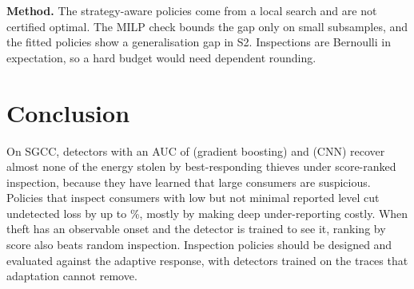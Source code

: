 \documentclass[journal]{IEEEtran}
\begin{document}
\textbf{Method.} The strategy-aware policies come from a local search and are not certified optimal. The MILP check bounds the gap only on small subsamples, and the fitted policies show a generalisation gap in S2. Inspections are Bernoulli in expectation, so a hard budget would need dependent rounding.

\section{Conclusion}
On SGCC, detectors with an AUC of \rAucLevel{} (gradient boosting) and \rCnnAuc{} (CNN) recover almost none of the energy stolen by best-responding thieves under score-ranked inspection, because they have learned that large consumers are suspicious. Policies that inspect consumers with low but not minimal reported level cut undetected loss by up to \rSeGainRelMaxSOne\%, mostly by making deep under-reporting costly. When theft has an observable onset and the detector is trained to see it, ranking by score also beats random inspection. Inspection policies should be designed and evaluated against the adaptive response, with detectors trained on the traces that adaptation cannot remove.



\end{document}
